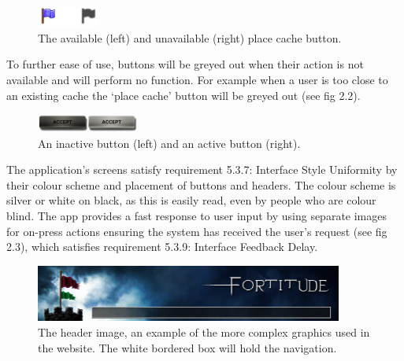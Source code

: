 \begin{figure}
	\vspace{-25pt}
	\begin{center}
	\includegraphics[width=0.18\textwidth]{images/flags_greye}
	\caption{The available (left) and unavailable (right) place cache button.}
	\label{flags_greye}
	\end{center}
	\vspace{-10pt}
\end{figure}

To further ease of use, buttons will be greyed out when their action is not available and will perform no function. For example when a user is too close to an existing cache the ‘place cache’ button will be greyed out (see fig 2.2).
\begin{figure}[ht]
	\vspace{-10pt}
	\begin{center}
	\includegraphics[width=0.3\textwidth]{images/buttons}
	\vspace{-10pt}
	\caption{An inactive button (left) and an active button (right).}
	\label{buttons}
	\end{center}
\end{figure}
The application’s screens satisfy requirement 5.3.7: Interface Style Uniformity by their colour scheme and placement of buttons and headers. The colour scheme is silver or white on black, as this is easily read, even by people who are colour blind. The app provides a fast response to user input by using separate images for on-press actions ensuring the system has received the user’s request (see fig 2.3), which satisfies requirement 5.3.9: Interface Feedback Delay.

\begin{figure}[ht]
	\begin{center}
	\includegraphics[width=0.9\textwidth]{images/website_header_background}
	\caption{The header image, an example of the more complex graphics used in the website. The white bordered box will hold the navigation.}
	\label{website_header_background}
	\end{center}
	\vspace{-20pt}
\end{figure}

